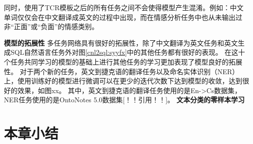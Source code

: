 同时，使用了TCR模板之后的所有任务之间不会使得模型产生混淆。例如：中文单词仅仅会在中文翻译成英文的过程中出现，而在情感分析任务中也从未输出过非“正面”或“负面”的情感类别。

\textbf{模型的拓展性}
多任务网络具有很好的拓展性，除了中文翻译为英文任务和英文生成SQL自然语言任务外对图\ref{cnl2sql:syyfx}中的其他任务都有很好的表现。
在这十个任务共同学习的模型的基础上进行其他任务的学习更加表现了模型良好的拓展性。
对于两个新的任务，英文到捷克语的翻译任务以及命名实体识别（NER）上，使用训练好的模型进行微调可以在更少的迭代次数下达到模型的收敛，达到很好的效果，如图xx。
其中，英文到捷克语的翻译任务使用的是En->Cs数据集，NER任务使用的是OntoNotes 5.0数据集[！！引用！！]。
\textbf{文本分类的零样本学习}

\section{本章小结}
